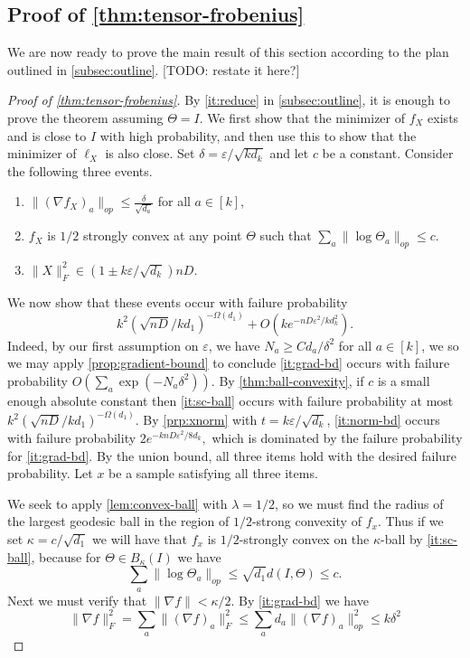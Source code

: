 \documentclass{article}
\newcommand\eps{\varepsilon}
\newcommand\samp{x}
\newcommand\rv{X}
\newcommand{\CF}[1]{{\color{purple}[CF: #1]}}
\newcommand{\TODO}[1]{{\color{blue}[TODO: #1]}}
\begin{document}
\subsection{Proof of \cref{thm:tensor-frobenius}}
We are now ready to prove the main result of this section according to the plan outlined in \cref{subsec:outline}.
\TODO{restate it here?}

\begin{proof}[Proof of \cref{thm:tensor-frobenius}]By \cref{it:reduce} in \cref{subsec:outline}, it is enough to prove the theorem assuming $\Theta = I$. We first show that the minimizer of $f_\rv$ exists and is close to $I$ with high probability, and then use this to show that the minimizer of $\ell_\rv$ is also close.  Set $\delta = \eps/\sqrt{k d_k}$ and let $c$ be a constant. Consider the following three events.
\begin{enumerate}
\item\label{it:grad-bd} $\|(\nabla f_\rv)_{a}\|_{op} \leq \frac{\delta}{\sqrt{d_{a}}}$ for all $a \in [k]$,
\item\label{it:sc-ball} $f_\rv$ is $1/2$ strongly convex at any point $\Theta$ such that $\sum_a \|\log \Theta_a\|_{op} \leq  c.$
\item\label{it:norm-bd} $\| \rv\|_F^2 \in (1 \pm k \eps/\sqrt{d_k}) nD.$
\end{enumerate}
We now show that these events occur with failure probability $$k^2 \left(\sqrt{nD} / kd_1 \right)^{ - \Omega(d_1)} + O(k e^{ - nD \eps^2 / k d_k^2}).$$ Indeed, by our first assumption on $\eps$, we have $N_a \geq C d_a/\delta^2$ for all $a \in [k]$, we so we may apply \cref{prop:gradient-bound} to conclude \cref{it:grad-bd} occurs with failure probability $O\left( \sum_a \exp ( - N_a \delta^2)\right)$. 
By \cref{thm:ball-convexity}, if $c$ is a small enough absolute constant then \cref{it:sc-ball} occurs with failure probability at most $k^2 \left(\sqrt{nD} / kd_1 \right)^{ - \Omega(d_1)}$. By \cref{prp:xnorm} with $t = k \eps/\sqrt{d_k}$, \cref{it:norm-bd} occurs with failure probability $2e^{- k nD \eps^2/8 d_k},$ which is dominated by the failure probability for \cref{it:grad-bd}. By the union bound, all three items hold with the desired failure probability. Let $\samp$ be a sample satisfying all three items.


We seek to apply \cref{lem:convex-ball} with $\lambda = 1/2$, so we must find the radius of the largest geodesic ball in the region of $1/2$-strong convexity of $f_\samp$. Thus if we set $\kappa = c/\sqrt{d_1}$ we will have that $f_\samp$ is $1/2$-strongly convex on the $\kappa$-ball by \cref{it:sc-ball}, because for $\Theta \in B_\kappa(I)$ we have
$$ \sum_a \|\log \Theta_a\|_{op} \leq \sqrt{d_1} d(I, \Theta) \leq c.$$
Next we must verify that $\|\nabla f\| < \kappa/2$. By \cref{it:grad-bd} we have
\[  \|\nabla f\|_F^{2} = \sum_{a} \|(\nabla f)_{a}\|_{F}^{2} \leq \sum_{a} d_a \|(\nabla f)_{a}\|_{op}^{2} \leq  k \delta^{2} \]


\end{proof}
\end{document}
